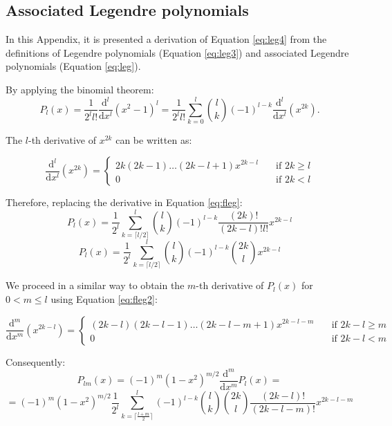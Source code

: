 \documentclass[12pt]{article}
\begin{document}
\begin{appendix}
\section{Associated Legendre polynomials}
\label{app:legendre}
    
In this Appendix, it is presented a derivation of Equation \ref{eq:leg4} from the definitions of Legendre polynomials (Equation \ref{eq:leg3}) and associated Legendre polynomials (Equation \ref{eq:leg}).

By applying the binomial theorem:
\begin{equation}
    \label{eq:fleg}
    P_l(x)= \frac{1}{2^l l!} \frac{\mathrm{d}^l}{\mathrm{d}x^l}(x^2-1)^l = \frac{1}{2^l l!} \sum_{k=0}^l {l \choose k} (-1)^{l-k} \frac{\mathrm{d}^l}{\mathrm{d}x^l}(x^{2k}).
\end{equation}

The $l$-th derivative of $x^{2k}$ can be written as:

\[ \frac{\mathrm{d}^l}{\mathrm{d}x^l}(x^{2k}) =
  \begin{cases}
    2k (2k-1) \ldots (2k-l+1) x^{2k-l}      & \quad \text{if } 2k \ge l \\
    0 & \quad \text{if } 2k < l
  \end{cases}
\]

Therefore, replacing the derivative in Equation \ref{eq:fleg}:
\begin{equation*}
    P_l(x) = \frac{1}{2^l} \sum_{k=\lceil l/2 \rceil}^l {l \choose k} (-1)^{l-k} \frac{(2k)!}{(2k-l)! l!} x^{2k-l}
\end{equation*}
\begin{equation}
    \label{eq:fleg2}
    P_l(x) = \frac{1}{2^l} \sum_{k=\lceil l/2 \rceil}^l {l \choose k} (-1)^{l-k} {2k \choose l} x^{2k-l}
\end{equation}

We proceed in a similar way to obtain the $m$-th derivative of $P_l(x)$ for $0 < m \le l$ using Equation \ref{eq:fleg2}:

\[ \frac{\mathrm{d}^m}{\mathrm{d}x^m}(x^{2k-l}) =
  \begin{cases}
    (2k-l) (2k-l-1) \ldots (2k-l-m+1) x^{2k-l-m}      & \quad \text{if } 2k-l \ge m \\
    0 & \quad \text{if } 2k -l < m
  \end{cases}
\]

Consequently:
\begin{equation*}
    P_{lm}(x)=(-1)^m (1-x^2)^{m/2} \frac{\mathrm{d}^m}{\mathrm{d}x^m} P_l(x) = 
\end{equation*}
\begin{equation*}
     = (-1)^m (1-x^2)^{m/2} \frac{1}{2^l} \sum_{k = \lceil \frac{l+m}{2} \rceil}^{l} (-1)^{l-k} {l \choose k} {2k \choose l} \frac{(2k-l)!}{(2k-l-m)!} x^{2k-l-m}
\end{equation*}

\end{appendix}
\end{document}
